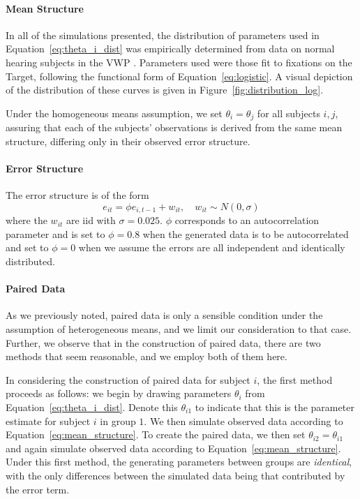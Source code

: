 \documentclass{article}
\begin{document}
\paragraph{Mean Structure} In all of the simulations presented, the distribution of parameters used in Equation~\ref{eq:theta_i_dist} was empirically determined from data on normal hearing subjects in the VWP \citep{FarrisTrimble2014}. Parameters used were those fit to fixations on the Target, following the functional form of Equation~\ref{eq:logistic}. A visual depiction of the distribution of these curves is given in Figure~\ref{fig:distribution_log}.

Under the homogeneous means assumption, we set $\theta_i = \theta_j$ for all subjects $i,j$, assuring that each of the subjects' observations is derived from the same mean structure, differing only in their observed error structure. 


\paragraph{Error Structure} The error structure is of the form
\begin{equation}
e_{it} = \phi e_{i, t-1} + w_{it}, \quad w_{it} \sim N(0, \sigma)
\end{equation}
where the $w_{it}$ are iid with $\sigma = 0.025$. $\phi$ corresponds to an autocorrelation parameter and is set to $\phi = 0.8$ when the generated data is to be autocorrelated and set to $\phi = 0$ when we assume the errors are all independent and identically distributed. 

\paragraph{Paired Data} As we previously noted, paired data is only a sensible condition under the assumption of heterogeneous means, and we limit our consideration to that case. Further, we observe that in the construction of paired data, there are two methods that seem reasonable, and we employ both of them here. 

In considering the construction of paired data for subject $i$, the first method proceeds as follows: we begin by drawing parameters $\theta_i$ from Equation~\ref{eq:theta_i_dist}. Denote this $\theta_{i1}$ to indicate that this is the parameter estimate for subject $i$ in group $1$. We then simulate observed data according to Equation~\ref{eq:mean_structure}. To create the paired data, we then set $\theta_{i2} = \theta_{i1}$ and again simulate observed data according to Equation~\ref{eq:mean_structure}. Under this first method, the generating parameters between groups are \textit{identical}, with the only differences between the simulated data being that contributed by the error term.
\end{document}
